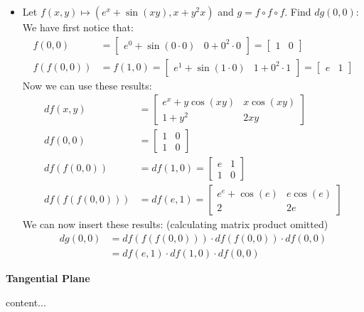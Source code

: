 \documentclass[25pt]{sciposter}
\newenvironment{method}[1]{\begin{mdframed}[backgroundcolor=blue!10,innertopmargin=15pt, innerbottommargin=15pt, nobreak=true]
		\textbf{#1 }
	}
	{ 
	\end{mdframed}
}
\begin{document}
\begin{multicols}{3}
\begin{itemize}
	\item Let $f(x,y)\mapsto (e^x + \sin(xy), x+y^2x)$ and $g = f\circ f \circ f$. Find $dg(0,0)$: We have first notice that:
	\begin{align*}
		f(0,0) &= \begin{bmatrix}
		e^0 + \sin(0\cdot 0) & 0 + 0^2\cdot 0
		\end{bmatrix} = \begin{bmatrix}
		1 & 0
		\end{bmatrix}\\
		f(f(0,0)) &= f(1,0) = \begin{bmatrix}
		e^1 + \sin(1\cdot 0) & 1 + 0^2\cdot 1
		\end{bmatrix} = \begin{bmatrix}
		e & 1
		\end{bmatrix}
	\end{align*}
	Now we can use these results:
	\begin{align*}
		df(x,y) &= \begin{bmatrix}
		e^{x} + y\cos(xy) & x\cos(xy) \\1+y^2 & 2xy
		\end{bmatrix}\\
		df(0,0) &= \begin{bmatrix} 1 & 0 \\ 1 & 0
		\end{bmatrix}\\
		df(f(0,0)) &= df(1,0) = \begin{bmatrix}
		e & 1 \\ 1& 0
		\end{bmatrix}\\
		df(f(f(0,0))) &= df(e,1) =  \begin{bmatrix}
		e^e + \cos(e) & e\cos(e) \\ 2 & 2e
		\end{bmatrix}
	\end{align*}
	We can now insert these results: (calculating matrix product omitted)
	\begin{align*}
		dg(0,0) &= df(f(f(0,0)))\cdot df(f(0,0)) \cdot df(0,0) \\
		&= df(e,1) \cdot df(1,0)\cdot df(0,0)
	\end{align*}
\end{itemize}

\begin{method}{Tangential Plane}
	content...
\end{method}





\end{multicols}
\end{document}
